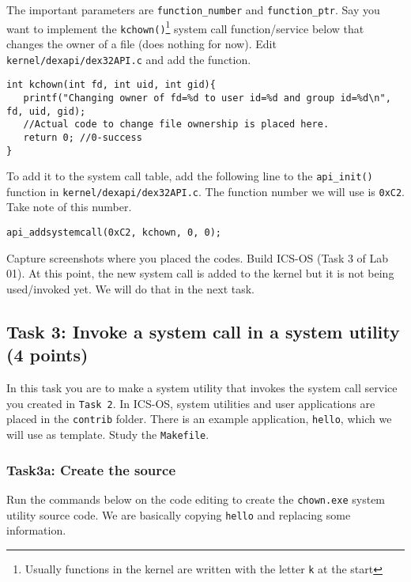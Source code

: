 \documentclass[a4paper, 11pt,oneside]{article}
\begin{document}
The important parameters are \texttt{function\_number} and 
\texttt{function\_ptr}. Say you want to implement the 
\texttt{kchown()}\footnote{Usually functions in the kernel are written with the 
letter \texttt{k} at the start} system call function/service below that changes 
the owner of a file (does nothing for now). Edit  
\texttt{kernel/dexapi/dex32API.c} and add the function.

\begin{verbatim}
int kchown(int fd, int uid, int gid){
   printf("Changing owner of fd=%d to user id=%d and group id=%d\n", fd, uid, gid);
   //Actual code to change file ownership is placed here.   
   return 0; //0-success
}
\end{verbatim}

To add it to the system call table, add the following line to the 
\texttt{api\_init()} function in \newline 
\texttt{kernel/dexapi/dex32API.c}. The function number we will use is 
\texttt{0xC2}. Take note of this number.

\begin{verbatim}
api_addsystemcall(0xC2, kchown, 0, 0);
\end{verbatim}

Capture screenshots where you placed the codes. 
Build ICS-OS (Task 3 of Lab 01). At this point, the new system call is added to 
the kernel but it 
is not being used/invoked yet. We will do that in the next task. 

\subsection*{Task 3: Invoke a system call in a system utility (4 points)}
In this task you are to make a system utility that invokes the system call 
service you created in \texttt{Task 2}. In ICS-OS, system utilities and user 
applications are placed in the \texttt{contrib} folder. There is an example 
application, \texttt{hello}, which we will use as template. Study the 
\texttt{Makefile}. 

\subsubsection*{Task3a: Create the source}
Run the commands below on the code editing to create the  
\texttt{chown.exe} system utility source code. We are basically copying 
\texttt{hello} and replacing some information.
\end{document}
